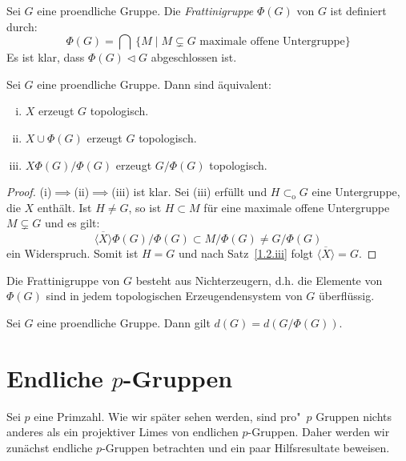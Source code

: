 \documentclass[11pt,a4paper,openany]{memoir}
\begin{document}
\begin{definition}
Sei $G$ eine proendliche Gruppe. Die \textit{Frattinigruppe} $\Phi(G)$ von $G$ ist definiert durch:
\[\Phi(G) = \bigcap\ \{M\mid M\subsetneq  G\text{ maximale offene Untergruppe} \} \]
Es ist klar, dass $\Phi(G)\lhd G$ abgeschlossen ist. 
\end{definition}

\begin{proposition}\label{1.9}
Sei $G$ eine proendliche Gruppe. Dann sind äquivalent:
\begin{enumerate}[(i)]
\item $X$ erzeugt $G$ topologisch.
\item $X\cup\Phi(G)$ erzeugt $G$ topologisch.
\item $X\Phi(G)/\Phi(G)$ erzeugt $G/\Phi(G)$ topologisch.
\end{enumerate}
\end{proposition}

\begin{proof}
(i)$\implies$(ii)$\implies$(iii) ist klar. Sei (iii) erfüllt und $H\subset_\text{o}G$ eine Untergruppe, die $X$ enthält. Ist $H\neq G$, so ist $H\subset M$ für eine maximale offene Untergruppe $M\subsetneq G$ und es gilt:
\[\overline{\langle X\rangle }\Phi(G)/\Phi(G)\subset M/\Phi(G)\neq G/\Phi(G) \]
ein Widerspruch. Somit ist $H=G$ und nach Satz~\ref{1.2.iii} folgt $\overline{\langle X\rangle}=G$.
\end{proof}

\begin{remark}
Die Frattinigruppe von $G$ besteht aus Nichterzeugern, d.h. die Elemente von $\Phi(G)$ sind in jedem topologischen Erzeugendensystem von $G$ überflüssig.
\end{remark}

\begin{corollary}\label{cor:1.9}
Sei $G$ eine proendliche Gruppe. Dann gilt $d(G)=d(G/\Phi(G))$.
\end{corollary}

\section{Endliche $p$-Gruppen}

Sei $p$ eine Primzahl. Wie wir später sehen werden, sind pro"~$p$ Gruppen nichts anderes als ein projektiver Limes von endlichen $p$-Gruppen. Daher werden wir zunächst endliche $p$-Gruppen betrachten und ein paar Hilfsresultate beweisen.
\end{document}
